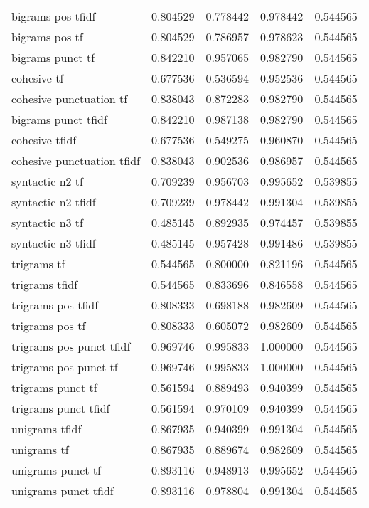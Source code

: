 \begin{tabular}{lrrrr}
bigrams pos tfidf          &  0.804529 &     0.778442 &       0.978442 &             0.544565 \\
bigrams pos tf             &  0.804529 &     0.786957 &       0.978623 &             0.544565 \\
bigrams punct tf           &  0.842210 &     0.957065 &       0.982790 &             0.544565 \\
cohesive tf                &  0.677536 &     0.536594 &       0.952536 &             0.544565 \\
cohesive punctuation tf    &  0.838043 &     0.872283 &       0.982790 &             0.544565 \\
bigrams punct tfidf        &  0.842210 &     0.987138 &       0.982790 &             0.544565 \\
cohesive tfidf             &  0.677536 &     0.549275 &       0.960870 &             0.544565 \\
cohesive punctuation tfidf &  0.838043 &     0.902536 &       0.986957 &             0.544565 \\
syntactic n2 tf            &  0.709239 &     0.956703 &       0.995652 &             0.539855 \\
syntactic n2 tfidf         &  0.709239 &     0.978442 &       0.991304 &             0.539855 \\
syntactic n3 tf            &  0.485145 &     0.892935 &       0.974457 &             0.539855 \\
syntactic n3 tfidf         &  0.485145 &     0.957428 &       0.991486 &             0.539855 \\
trigrams tf                &  0.544565 &     0.800000 &       0.821196 &             0.544565 \\
trigrams tfidf             &  0.544565 &     0.833696 &       0.846558 &             0.544565 \\
trigrams pos tfidf         &  0.808333 &     0.698188 &       0.982609 &             0.544565 \\
trigrams pos tf            &  0.808333 &     0.605072 &       0.982609 &             0.544565 \\
trigrams pos punct tfidf   &  0.969746 &     0.995833 &       1.000000 &             0.544565 \\
trigrams pos punct tf      &  0.969746 &     0.995833 &       1.000000 &             0.544565 \\
trigrams punct tf          &  0.561594 &     0.889493 &       0.940399 &             0.544565 \\
trigrams punct tfidf       &  0.561594 &     0.970109 &       0.940399 &             0.544565 \\
unigrams tfidf             &  0.867935 &     0.940399 &       0.991304 &             0.544565 \\
unigrams tf                &  0.867935 &     0.889674 &       0.982609 &             0.544565 \\
unigrams punct tf          &  0.893116 &     0.948913 &       0.995652 &             0.544565 \\
unigrams punct tfidf       &  0.893116 &     0.978804 &       0.991304 &             0.544565 \\
\bottomrule
\end{tabular}
